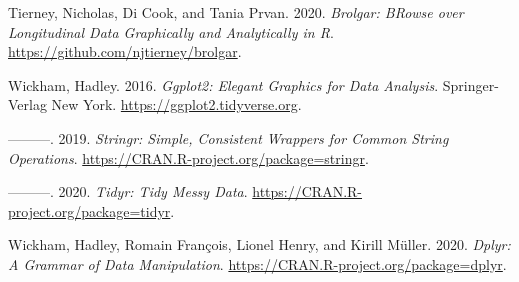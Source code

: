\documentclass{article}
\begin{document}
\leavevmode\hypertarget{ref-brolgar}{}%
Tierney, Nicholas, Di Cook, and Tania Prvan. 2020. \emph{Brolgar: BRowse
over Longitudinal Data Graphically and Analytically in R}.
\url{https://github.com/njtierney/brolgar}.

\leavevmode\hypertarget{ref-ggplot2}{}%
Wickham, Hadley. 2016. \emph{Ggplot2: Elegant Graphics for Data
Analysis}. Springer-Verlag New York.
\url{https://ggplot2.tidyverse.org}.

\leavevmode\hypertarget{ref-stringr}{}%
---------. 2019. \emph{Stringr: Simple, Consistent Wrappers for Common
String Operations}. \url{https://CRAN.R-project.org/package=stringr}.

\leavevmode\hypertarget{ref-tidyr}{}%
---------. 2020. \emph{Tidyr: Tidy Messy Data}.
\url{https://CRAN.R-project.org/package=tidyr}.

\leavevmode\hypertarget{ref-dplyr}{}%
Wickham, Hadley, Romain François, Lionel Henry, and Kirill Müller. 2020.
\emph{Dplyr: A Grammar of Data Manipulation}.
\url{https://CRAN.R-project.org/package=dplyr}.



\end{document}

